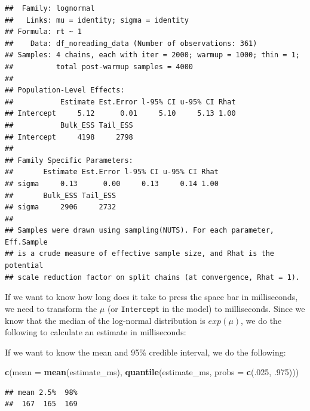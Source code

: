 \documentclass[12pt,]{krantz}
\newenvironment{Shaded}{\begin{snugshade}}{\end{snugshade}}
\newcommand{\DataTypeTok}[1]{\textcolor[rgb]{0.13,0.29,0.53}{#1}}
\newcommand{\DecValTok}[1]{\textcolor[rgb]{0.00,0.00,0.81}{#1}}
\newcommand{\FloatTok}[1]{\textcolor[rgb]{0.00,0.00,0.81}{#1}}
\newcommand{\KeywordTok}[1]{\textcolor[rgb]{0.13,0.29,0.53}{\textbf{#1}}}
\newcommand{\NormalTok}[1]{#1}
\newcommand{\OperatorTok}[1]{\textcolor[rgb]{0.81,0.36,0.00}{\textbf{#1}}}
\newcommand{\StringTok}[1]{\textcolor[rgb]{0.31,0.60,0.02}{#1}}
\theoremstyle{definition}
\theoremstyle{definition}
\theoremstyle{definition}
\theoremstyle{remark}
\begin{document}
\begin{verbatim}
##  Family: lognormal 
##   Links: mu = identity; sigma = identity 
## Formula: rt ~ 1 
##    Data: df_noreading_data (Number of observations: 361) 
## Samples: 4 chains, each with iter = 2000; warmup = 1000; thin = 1;
##          total post-warmup samples = 4000
## 
## Population-Level Effects: 
##           Estimate Est.Error l-95% CI u-95% CI Rhat
## Intercept     5.12      0.01     5.10     5.13 1.00
##           Bulk_ESS Tail_ESS
## Intercept     4198     2798
## 
## Family Specific Parameters: 
##       Estimate Est.Error l-95% CI u-95% CI Rhat
## sigma     0.13      0.00     0.13     0.14 1.00
##       Bulk_ESS Tail_ESS
## sigma     2906     2732
## 
## Samples were drawn using sampling(NUTS). For each parameter, Eff.Sample 
## is a crude measure of effective sample size, and Rhat is the potential 
## scale reduction factor on split chains (at convergence, Rhat = 1).
\end{verbatim}

If we want to know how long does it take to press the space bar in milliseconds, we need to transform the \(\mu\) (or \texttt{Intercept} in the model) to milliseconds. Since we know that the median of the log-normal distribution is \(exp(\mu)\), we do the following to calculate an estimate in milliseconds:

\begin{Shaded}
\end{Shaded}

If we want to know the mean and 95\% credible interval, we do the following:

\begin{Shaded}
\begin{Highlighting}[]
\KeywordTok{c}\NormalTok{(}\DataTypeTok{mean =} \KeywordTok{mean}\NormalTok{(estimate_ms), }\KeywordTok{quantile}\NormalTok{(estimate_ms, }\DataTypeTok{probs =} \KeywordTok{c}\NormalTok{(.}\DecValTok{025}\NormalTok{, }\FloatTok{.975}\NormalTok{)))}
\end{Highlighting}
\end{Shaded}

\begin{verbatim}
## mean 2.5%  98% 
##  167  165  169
\end{verbatim}
\end{document}
